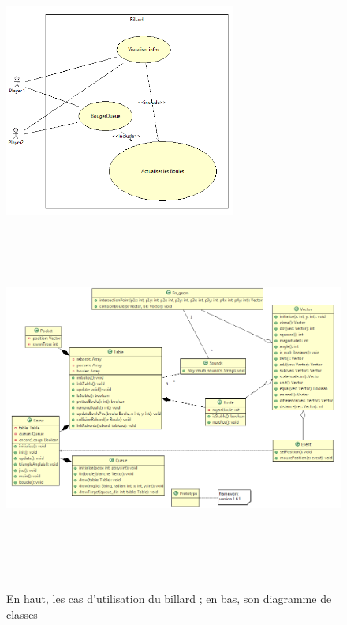 \begin{figure}[h]
 \centering
 \includegraphics[height=7cm]{../umls/UML_images/Billard/utilisation} \hfill
 \includegraphics[width=\textwidth,height=12cm]{../umls/UML_images/Billard/class} \hfill
 \caption{En haut, les cas d'utilisation du billard ; en bas, son diagramme de classes}
\end{figure}


% 
% 

\clearpage
{}

